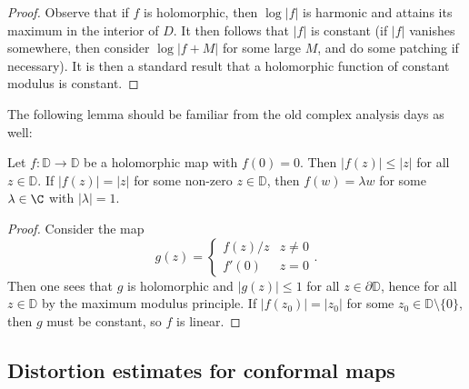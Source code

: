 \documentclass[a4paper]{article}
\renewcommand\D{\mathbb{D}}
\begin{document}
\begin{proof}
  Observe that if $f$ is holomorphic, then $\log |f|$ is harmonic and attains its maximum in the interior of $D$. It then follows that $|f|$ is constant (if $|f|$ vanishes somewhere, then consider $\log |f + M|$ for some large $M$, and do some patching if necessary). It is then a standard result that a holomorphic function of constant modulus is constant.
\end{proof}

The following lemma should be familiar from the old complex analysis days as well:
\begin{lemma}
  Let $f: \D \to \D$ be a holomorphic map with $f(0) = 0$. Then $|f(z)| \leq |z|$ for all $z \in \D$. If $|f(z)| = |z|$ for some non-zero $z \in \D$, then $f(w) = \lambda w$ for some $\lambda \in \C$ with $|\lambda| = 1$.
\end{lemma}

\begin{proof}
  Consider the map
  \[
   g(z) =
    \begin{cases}
      f(z)/z & z \not =0\\
      f'(0) & z = 0
    \end{cases}.
  \]
  Then one sees that $g$ is holomorphic and $|g(z)| \leq 1$ for all $z \in \partial\D$, hence for all $z \in \D$ by the maximum modulus principle. If $|f(z_0)| = |z_0|$ for some $z_0 \in \D \setminus \{0\}$, then $g$ must be constant, so $f$ is linear.
\end{proof}

\subsection{Distortion estimates for conformal maps}
\end{document}
